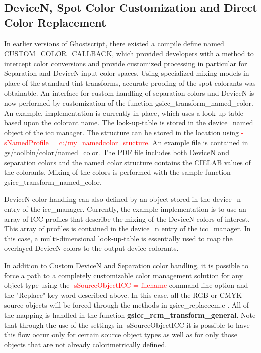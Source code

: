 \documentclass[12pt,notitlepage]{article}
\begin{document}
\subsection{DeviceN, Spot Color Customization and Direct Color Replacement}
\label{sec:devn}

In earlier versions of Ghostscript, there existed a compile define named \\
CUSTOM\_COLOR\_CALLBACK, which provided developers with a method to intercept color conversions and provide customized processing in particular for Separation and DeviceN input color spaces.  Using specialized mixing models in place of the standard tint transforms, accurate proofing of the spot colorants was obtainable.  An interface for custom handling of separation colors and DeviceN is now performed by customization of the function gsicc\_transform\_named\_color.  An example, implementation is currently in place, which uses a look-up-table based upon the colorant name.  The look-up-table is stored in the device\_named object of the icc manager.  The structure can be stored in the location using \textcolor{red}{-sNamedProfile = c:/my\_namedcolor\_stucture}.   An example file is contained in gs/toolbin/color/named\_color.  The PDF file includes both DeviceN and separation colors and the named color structure contains the CIELAB values of the colorants.   Mixing of the colors is performed with the sample function gsicc\_transform\_named\_color.

DeviceN color handling can also defined by an object stored in the device\_n entry of the icc\_manager.  Currently, the example implementation is to use an array of ICC profiles that describe the mixing of the DeviceN colors of interest.  This array of profiles is contained in the device\_n entry of the icc\_manager.  In this case, a multi-dimensional look-up-table is essentially used to map the overlayed DeviceN colors to the output device colorants.

In addition to Custom DeviceN and Separation color handling, it is possible to force a path to a completely customizable color management solution for any object type using the \textcolor{red}{-sSourceObjectICC = filename} command line option and the "Replace" key word described above.  In this case, all the RGB or CMYK source objects will be forced through the methods in gsicc\_replacecm.c .  All of the mapping is handled in the function {\bf gsicc\_rcm\_transform\_general}.  Note that through the use of the settings in -sSourceObjectICC it is possible to have this flow occur only for certain source object types as well as for only those objects that are not already colorimetrically defined.
\end{document}
